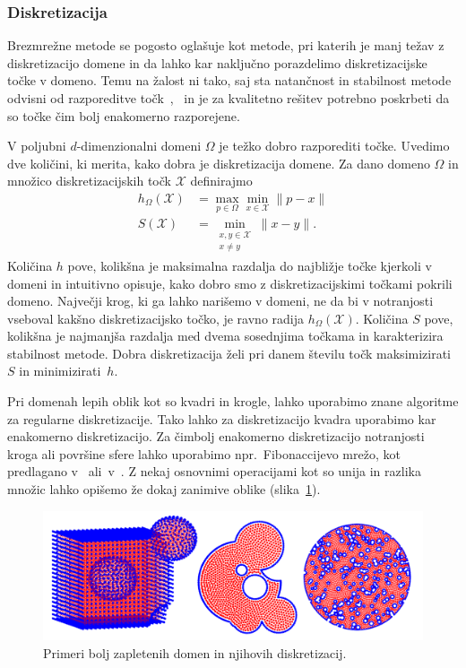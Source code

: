\documentclass[12pt,a4paper,twoside]{article}
\theoremstyle{definition} %
\theoremstyle{plain} %
\numberwithin{equation}{section}
\newcommand{\X}{\mathcal{X}}
\begin{document}
\subsubsection{Diskretizacija}
Brezmrežne metode se pogosto oglašuje kot metode, pri katerih je manj težav z diskretizacijo domene
in da lahko kar naključno porazdelimo diskretizacijske točke v domeno. Temu na žalost ni tako, saj
sta natančnost in stabilnost metode odvisni od razporeditve
točk~\cite[slika~8]{kosec2016local},~\cite{amani2012mixed} in je za kvalitetno rešitev potrebno
poskrbeti da so točke čim bolj enakomerno razporejene.

V poljubni $d$-dimenzionalni domeni $\Omega$ je težko dobro razporediti točke.
Uvedimo dve količini, ki merita, kako dobra je diskretizacija domene.
Za dano domeno $\Omega$ in množico diskretizacijskih točk $\X$ definirajmo
\begin{align}
  h_\Omega(\X) &= \max_{p \in \Omega} \min_{x \in \X} \|p - x\| \\
  \label{eq:def-hs}
  S(\X) &= \min_{\substack{x, y \in \X \\ x \neq y}} \|x-y\|.
\end{align}
Količina $h$ pove, kolikšna je maksimalna razdalja do najbližje točke kjerkoli v domeni in intuitivno
opisuje, kako dobro smo z diskretizacijskimi točkami pokrili domeno. Največji krog, ki ga lahko
narišemo v domeni, ne da bi v notranjosti vseboval kakšno diskretizacijsko točko, je ravno radija
$h_\Omega(\X)$. Količina $S$ pove, kolikšna je najmanjša razdalja med dvema sosednjima točkama in
karakterizira stabilnost metode. Dobra diskretizacija želi pri danem številu točk maksimizirati $S$
in minimizirati~$h$.

Pri domenah lepih oblik kot so kvadri in krogle, lahko uporabimo znane algoritme za regularne
diskretizacije. Tako lahko za diskretizacijo kvadra uporabimo kar enakomerno diskretizacijo. Za
čimbolj enakomerno diskretizacijo notranjosti kroga ali površine sfere lahko uporabimo
npr.~Fibonaccijevo mrežo, kot predlagano v~\cite{hannay2004fibonacci}
ali~v~\cite{gonzalez2010measurement}.
Z nekaj osnovnimi operacijami kot so unija in razlika množic lahko opišemo že dokaj zanimive oblike
(slika~\ref{fig:domains}).

\begin{figure}[!ht]
  \centering
  \includegraphics[width=\textwidth]{images/domains_generated.png}
  \caption{Primeri bolj zapletenih domen in njihovih diskretizacij.}
  \label{fig:domains}
\end{figure}
\end{document}
